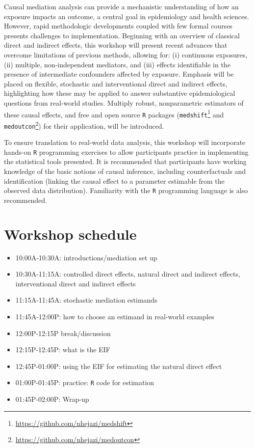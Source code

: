 \documentclass[
  12pt,
]{book}
\newcommand{\passthrough}[1]{#1}
\providecommand{\tightlist}{%
  \setlength{\itemsep}{0pt}\setlength{\parskip}{0pt}}
\renewcommand{\href}[2]{#2\footnote{\url{#1}}}
\theoremstyle{definition}
\theoremstyle{definition}
\theoremstyle{definition}
\newcommand{\1}{\mathbbm{1}}
\begin{document}
Causal mediation analysis can provide a mechanistic understanding of how an
exposure impacts an outcome, a central goal in epidemiology and health sciences.
However, rapid methodologic developments coupled with few formal courses
presents challenges to implementation. Beginning with an overview of classical
direct and indirect effects, this workshop will present recent advances that
overcome limitations of previous methods, allowing for: (i) continuous
exposures, (ii) multiple, non-independent mediators, and (iii) effects
identifiable in the presence of intermediate confounders affected by exposure.
Emphasis will be placed on flexible, stochastic and interventional direct and
indirect effects, highlighting how these may be applied to answer substantive
epidemiological questions from real-world studies. Multiply robust,
nonparametric estimators of these causal effects, and free and open source \passthrough{\lstinline!R!}
packages (\href{https://github.com/nhejazi/medshift}{\passthrough{\lstinline!medshift!}} and
\href{https://github.com/nhejazi/medoutcon}{\passthrough{\lstinline!medoutcon!}}) for their application, will
be introduced.

To ensure translation to real-world data analysis, this workshop will
incorporate hands-on \passthrough{\lstinline!R!} programming exercises to allow participants practice in
implementing the statistical tools presented. It is recommended that
participants have working knowledge of the basic notions of causal inference,
including counterfactuals and identification (linking the causal effect to a
parameter estimable from the observed data distribution). Familiarity with the
\passthrough{\lstinline!R!} programming language is also recommended.

\hypertarget{schedule}{%
\section{Workshop schedule}\label{schedule}}

\begin{itemize}
\tightlist
\item
  10:00A-10:30A: introductions/mediation set up 
\item
  10:30A-11:15A: controlled direct effects, natural direct and indirect effects,
  interventional direct and indirect effects 
\item
  11:15A-11:45A: stochastic mediation estimands 
\item
  11:45A-12:00P: how to choose an estimand in real-world examples 
\item
  12:00P-12:15P break/discussion
\item
  12:15P-12:45P: what is the EIF 
\item
  12:45P-01:00P: using the EIF for estimating the natural direct
  effect 
\item
  01:00P-01:45P: practice: \passthrough{\lstinline!R!} code for estimation 
\item
  01:45P-02:00P: Wrap-up
\end{itemize}
\end{document}
